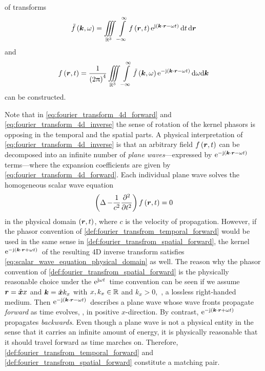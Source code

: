 of transforms
\begin{equation}\label{eq:fourier_transform_4d_forward}
	\tilde{f} \left( \pvec{k}, \omega \right) = 
	\iiint\limits_{\R^3}
	\int\limits_{-\infty}^{\infty} 
	f \left( \robs, t \right)
	\exp{\im \left( \pvec{k} \cdot \robs - \omega t \right)}
	\dd t \,
	\dd \robs
\end{equation}
and
\begin{equation}\label{eq:fourier_transform_4d_inverse}
	f \left( \robs, t \right) = 
	\frac{1}{\left(2\pi\right)^4}
	\iiint\limits_{\R^3} 
	\int\limits_{-\infty}^{\infty}
	\tilde{f} \left( \pvec{k}, \omega \right)
	\exp{-\im \left( \pvec{k} \cdot \robs - \omega t \right)}
	\dd \omega
	\dd \pvec{k}
\end{equation}
can be constructed.

Note that in \eqref{eq:fourier_transform_4d_forward} and
\eqref{eq:fourier_transform_4d_inverse} the sense of rotation of the kernel
phasors is opposing in the temporal and the spatial parts.
A physical interpretation of \eqref{eq:fourier_transform_4d_inverse} is
that an arbitrary field $f \left( \robs, t \right)$ can be decomposed 
into an infinite number of \emph{plane waves}---expressed by 
$\exp{-\im \left( \pvec{k} \cdot \robs - \omega t \right)}$ terms---where
the expansion coefficients are given by \eqref{eq:fourier_transform_4d_forward}.
Each individual plane wave solves the homogeneous scalar wave
equation \cite[32]{Sommerfeld1964}
\begin{equation}\label{eq:scalar_wave_equation_physical_domain}
	\left( \laplace - \frac{1}{c^2} \frac{\partial^2}{\partial t^2} \right)	
	f \left( \pvec{r}, t \right) = 0
\end{equation}
in the physical domain $\left(\pvec{r}, t\right)$, where $c$ is
the velocity of propagation.
However, if the phasor convention of
\cref{def:fourier_transfrom_temporal_forward} would be used in the same sense in
\cref{def:fourier_transfrom_spatial_forward}, the kernel
$\exp{-\im \left( \pvec{k} \cdot \robs + \omega t \right)}$
of the resulting 4D inverse transform satisfies
\eqref{eq:scalar_wave_equation_physical_domain} as well.
The reason why the phasor convention of
\cref{def:fourier_transfrom_spatial_forward} is the physically reasonable choice
under the $\mathrm{e}^{\mathrm{j} \omega t}\,$ time convention
can be seen if we assume $\pvec{r} = \uv{x} x$ and $\pvec{k} = \uv{x} k_x$
with $x, k_x \in \mathbb{R}$ and $k_x > 0$,~\ie, a lossless right-handed medium.
Then $\exp{-\im \left( \pvec{k} \cdot \robs - \omega t \right)}$ describes
a plane wave whose wave fronts propagate \emph{forward} as time
evolves, \ie, in positive $x$-direction.
By contrast,
$\exp{-\im \left( \pvec{k} \cdot \robs + \omega t \right)}$
propagates \emph{backwards}.
Even though a plane wave is not a physical entity in the sense that it carries
an infinite amount of energy, it is physically reasonable that it should
travel forward as time marches on.
Therefore, \cref{def:fourier_transfrom_temporal_forward} and
\cref{def:fourier_transfrom_spatial_forward} constitute a matching pair.

